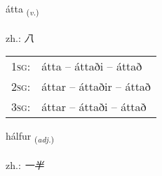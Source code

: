\documentclass[frontgrid, backgrid]{flacards}\usepackage[]{graphicx}\usepackage[]{xcolor}
\begin{document}
\renewcommand{\flhead}{\vskip5pt \fboxsep=0pt {\small\bfseries\footnotesize Sagnorð | 动词}}
\renewcommand{\fcfoot}{\vskip5pt \fboxsep=0pt \hspace{2pt}{\small\bfseries\footnotesize 1K}}

\renewcommand{\blhead}{\vskip5pt {\small\bfseries\footnotesize Sagnorð | 动词 }}
\renewcommand{\bcfoot}{\vskip5pt \hspace{2pt}{\small\bfseries\footnotesize 1K}}


{átta \small{\textsubscript{(\textit{v.})}} \\[1ex] %
\textphonetic{[auhta]} \\
zh.: \emph{八} \\  [2ex]
\renewcommand*{\arraystretch}{0.8}
\begin{tabular}{p{1cm}l}
\textsc{1sg}: & átta -- áttaði -- áttað \\ 
\textsc{2sg}: & áttar -- áttaðir -- áttað \\ 
\textsc{3sg}: & áttar -- áttaði -- áttað \\ 
\end{tabular}
}

\renewcommand{\flhead}{\vskip5pt \fboxsep=0pt {\small\bfseries\footnotesize Lýsingarorð | 形容词}}
\renewcommand{\fcfoot}{\vskip5pt \fboxsep=0pt \hspace{2pt}{\small\bfseries\footnotesize 1K}}

\renewcommand{\blhead}{\vskip5pt {\small\bfseries\footnotesize Lýsingarorð | 形容词 }}
\renewcommand{\bcfoot}{\vskip5pt \hspace{2pt}{\small\bfseries\footnotesize 1K}}


{hálfur \small{\textsubscript{(\textit{adj.})}} \\[1ex] %
\textphonetic{[haulvʏr]} \\
zh.: \emph{一半} \\  [2ex]
\renewcommand*{\arraystretch}{0.8}
}
\end{document}
